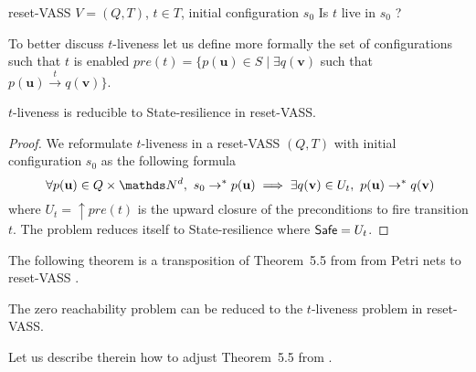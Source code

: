 {reset-VASS $V=(Q,T)$, $t \in T$, initial configuration $s_0$}
{Is $t$ live in $s_0$ ? \\}


To better discuss $t$-liveness let us define more formally the set of configurations such that $t$ is enabled
$pre(t)=\{ p(\textbf{u}) \in S \mid \exists q(\textbf{v})$ such that $ p(\textbf{u}) \xrightarrow{t} q(\textbf{v}) \}$.



\begin{proposition}\label{reductions}
{\sc $t$-liveness} is reducible to {\sc State-resilience} in reset-VASS.
\end{proposition}


\begin{proof}
We reformulate $t$-liveness 
in a 
reset-VASS $(Q,T)$ 
with initial configuration $s_0$
as the following formula
\[ ~ \forall p(\textbf{u}) \in Q \times \N^d, 
~ s_0 \rightarrow^* p(\textbf{u}) \implies \exists q(\textbf{v}) \in U_t, ~ p(\textbf{u}) \rightarrow^{*} q(\textbf{v})\]
where
$U_t=\uparrow pre(t)$ 
is the upward closure of the preconditions to fire transition $t$.  
The problem reduces itself to {\sc State-resilience}
where $\textsf{Safe} = U_t$.
\end{proof}


The following theorem is a transposition of Theorem~5.5 from \cite{peterson1981petri} from Petri nets to reset-VASS%
.
\begin{proposition}\label{liveness reset}
The  zero reachability problem can be reduced to the $t$-liveness problem in reset-VASS.
\end{proposition}





Let us describe therein how to adjust Theorem~5.5 from \cite{peterson1981petri}.

